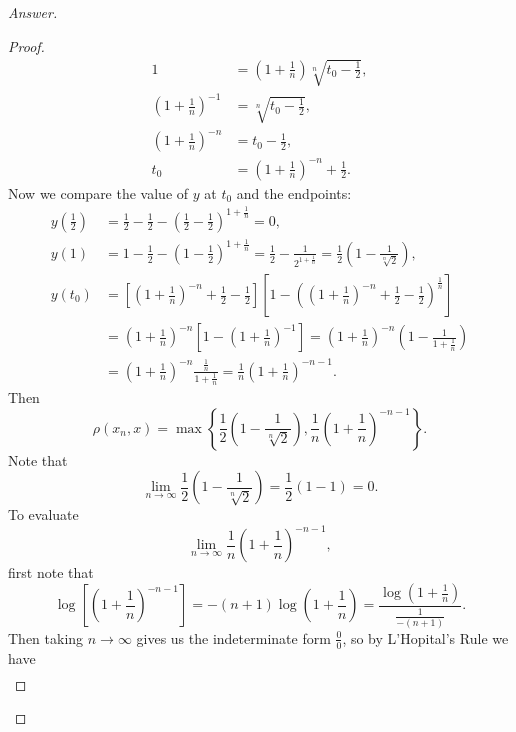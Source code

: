 \documentclass[12pt]{article}
\newcommand\paren[1]{\left( #1 \right)}
\newcommand\setb[1]{\left \{ #1 \right \}}
\newcommand{\sqbrack}[1]{\left [ #1 \right ]}
\theoremstyle{definition}
\begin{document}
\begin{proof}[Answer]
\begin{enumerate}[(a)]
\begin{proof}
\begin{align*}
                1 & = \paren{ 1 + \frac{1}{n} } \sqrt[n]{ t_0 - \frac{1}{2} } , \\
                \paren{ 1 + \frac{1}{n} }^{-1} & = \sqrt[n]{ t_0 - \frac{1}{2} } , \\
                \paren{ 1 + \frac{1}{n} }^{-n} & = t_0 - \frac{1}{2} , \\
                t_0 & = \paren{ 1 + \frac{1}{n} }^{-n} + \frac{1}{2}.
            \end{align*}
            Now we compare the value of $y$ at $t_0$ and the endpoints:
            \begin{align*}
                y \paren{ \frac{1}{2} } & = \frac{1}{2} - \frac{1}{2} - \paren{ \frac{1}{2} - \frac{1}{2} }^{1 + \frac{1}{n}} = 0, \\
                y(1) & = 1 - \frac{1}{2} - \paren{ 1 - \frac{1}{2} }^{1 + \frac{1}{n}} = \frac{1}{2} - \frac{1}{2^{1 + \frac{1}{n}}} = \frac{1}{2} \paren{ 1 - \frac{1}{\sqrt[n]{2}} }, \\
                y(t_0) & = \sqbrack{ \paren{ 1 + \frac{1}{n} }^{-n} + \frac{1}{2} - \frac{1}{2} } \sqbrack{ 1 - \paren{ \paren{ 1 + \frac{1}{n} }^{-n} + \frac{1}{2} - \frac{1}{2} }^{\frac{1}{n}} } \\
                & = \paren{ 1 + \frac{1}{n} }^{-n} \sqbrack{ 1 - \paren{ 1 + \frac{1}{n} }^{-1} } = \paren{ 1 + \frac{1}{n} }^{-n} \paren{ 1 - \frac{1}{1 + \frac{1}{n}} } \\
                & = \paren{ 1 + \frac{1}{n} }^{-n} \frac{ \frac{1}{n} }{ 1 + \frac{1}{n} } = \frac{1}{n} \paren{ 1 + \frac{1}{n} }^{-n-1}.
            \end{align*}
            Then 
            \[
                \rho \paren{ x_n , x } = \max \setb{ \frac{1}{2} \paren{ 1 - \frac{1}{\sqrt[n]{2}} } , \frac{1}{n} \paren{ 1 + \frac{1}{n} }^{-n-1} }.
            \]
            Note that 
            \[
                \lim\limits_{n \to \infty} \frac{1}{2} \paren{ 1 - \frac{1}{\sqrt[n]{2}} } = \frac{1}{2} (1 - 1) = 0.
            \]
            To evaluate 
            \[
                \lim\limits_{n \to \infty} \frac{1}{n} \paren{ 1 + \frac{1}{n} }^{-n-1},
            \]
            first note that 
            \[
                \log \sqbrack{ \paren{ 1 + \frac{1}{n} }^{-n-1} } = -(n+1) \log \paren{ 1 + \frac{1}{n} } = \frac{ \log \paren{ 1 + \frac{1}{n} } }{ \frac{1}{-(n+1)} }.
            \]
            Then taking $n \to \infty$ gives us the indeterminate form $\frac{0}{0}$, so by L'Hopital's Rule we have 
            \begin{align*}

\end{align*}
\end{proof}
\end{enumerate}
\end{proof}
\end{document}
